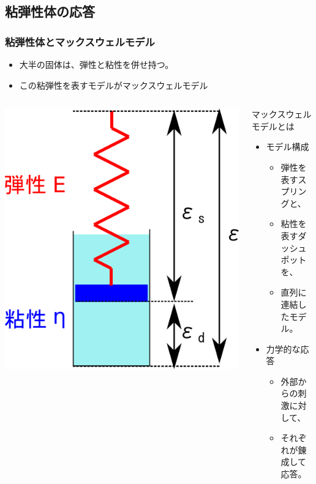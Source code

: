 \documentclass[12pt, dvipdfmx]{beamer}
\begin{document}
\subsection{粘弾性体の応答}
\begin{frame}
	\frametitle{粘弾性体とマックスウェルモデル}
	\begin{itemize}
		\item 大半の固体は、弾性と粘性を併せ持つ。
		\item この粘弾性を表すモデルがマックスウェルモデル
	\end{itemize}
	\begin{columns}[c, onlytextwidth]
		\centering
		\includegraphics[width=.9\textwidth]{Maxwell_model.png}
		\begin{block}{マックスウェルモデルとは}
			\begin{itemize}
				\item モデル構成
				\begin{itemize}
					\item 弾性を表すスプリングと、
					\item 粘性を表すダッシュポットを、
					\item 直列に連結したモデル。
				\end{itemize}
				\item 力学的な応答
				\begin{itemize}
					\item 外部からの刺激に対して、
					\item それぞれが錬成して応答。
				\end{itemize}
			\end{itemize}
			
		\end{block}
	\end{columns}
\end{frame}
\end{document}
